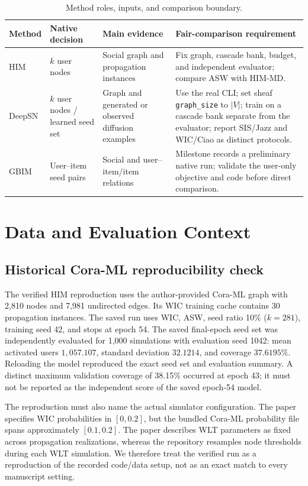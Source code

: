 \documentclass[10pt,twocolumn]{article}
\begin{document}
\begin{table}[t]
\centering\small
\caption{Method roles, inputs, and comparison boundary.}
\begin{tabularx}{\textwidth}{@{}p{}p{}p{}X@{}}
\toprule
Method & Native decision & Main evidence & Fair-comparison requirement \\
\midrule
HIM & $k$ user nodes & Social graph and propagation instances & Fix graph, cascade bank, budget, and independent evaluator; compare ASW with HIM-MD.\\
DeepSN & $k$ user nodes / learned seed set & Graph and generated or observed diffusion examples & Use the real CLI; set sheaf \texttt{graph\_size} to $|V|$; train on a cascade bank separate from the evaluator; report SIS/Jazz and WIC/Ciao as distinct protocols.\\
GBIM & User--item seed pairs & Social and user--item/item relations & Milestone records a preliminary native run; validate the user-only objective and code before direct comparison.\\
\bottomrule
\end{tabularx}
\end{table}

\section{Data and Evaluation Context}
\subsection{Historical Cora-ML reproducibility check}
The verified HIM reproduction uses the author-provided Cora-ML graph with 2,810 nodes and 7,981 undirected edges. Its WIC training cache contains 30 propagation instances. The saved run uses WIC, ASW, seed ratio 10\% ($k=281$), training seed 42, and stops at epoch 54. The saved final-epoch seed set was independently evaluated for 1,000 simulations with evaluation seed 1042: mean activated users $1,057.107$, standard deviation $32.1214$, and coverage $37.6195\%$. Reloading the model reproduced the exact seed set and evaluation summary. A distinct maximum validation coverage of 38.15\% occurred at epoch 43; it must not be reported as the independent score of the saved epoch-54 model.

The reproduction must also name the actual simulator configuration. The paper specifies WIC probabilities in $[0,0.2]$, but the bundled Cora-ML probability file spans approximately $[0.1,0.2]$. The paper describes WLT parameters as fixed across propagation realizations, whereas the repository resamples node thresholds during each WLT simulation. We therefore treat the verified run as a reproduction of the recorded code/data setup, not as an exact match to every manuscript setting.
\end{document}

